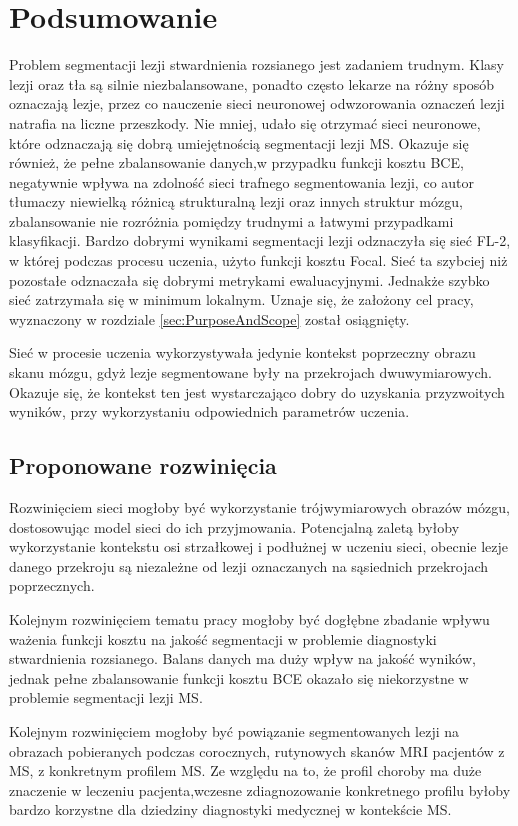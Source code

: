 \section{Podsumowanie}
\label{sec:Summary}
Problem segmentacji lezji stwardnienia rozsianego jest zadaniem trudnym. Klasy lezji oraz tła są silnie niezbalansowane, ponadto często lekarze na różny sposób oznaczają lezje, przez co nauczenie sieci neuronowej odwzorowania oznaczeń lezji natrafia na liczne przeszkody. Nie mniej, udało się otrzymać sieci neuronowe, które odznaczają się dobrą umiejętnością segmentacji lezji MS. Okazuje się również, że pełne zbalansowanie danych,w przypadku funkcji kosztu BCE, negatywnie wpływa na zdolność sieci trafnego segmentowania lezji, co autor tłumaczy niewielką różnicą strukturalną lezji oraz innych struktur mózgu, zbalansowanie nie rozróżnia pomiędzy trudnymi a łatwymi przypadkami klasyfikacji. Bardzo dobrymi wynikami segmentacji lezji odznaczyła się sieć FL-2, w której podczas procesu uczenia, użyto funkcji kosztu Focal. Sieć ta szybciej niż pozostałe odznaczała się dobrymi metrykami ewaluacyjnymi. Jednakże szybko sieć zatrzymała się w minimum lokalnym. Uznaje się, że założony cel pracy, wyznaczony w rozdziale \ref{sec:PurposeAndScope} został osiągnięty. 
\par
Sieć w procesie uczenia wykorzystywała jedynie kontekst poprzeczny obrazu skanu mózgu, gdyż lezje segmentowane były na przekrojach dwuwymiarowych. Okazuje się, że kontekst ten jest wystarczająco dobry do uzyskania przyzwoitych wyników, przy wykorzystaniu odpowiednich parametrów uczenia.

\subsection{Proponowane rozwinięcia}
\label{sec:extensions}
\par
Rozwinięciem sieci mogłoby być wykorzystanie trójwymiarowych obrazów mózgu, dostosowując model sieci do ich przyjmowania. Potencjalną zaletą byłoby wykorzystanie kontekstu osi strzałkowej i podłużnej w uczeniu sieci, obecnie lezje danego przekroju są niezależne od lezji oznaczanych na sąsiednich przekrojach poprzecznych.
\par
Kolejnym rozwinięciem tematu pracy mogłoby być dogłębne zbadanie wpływu ważenia funkcji kosztu na jakość segmentacji w problemie diagnostyki stwardnienia rozsianego. Balans danych ma duży wpływ na jakość wyników, jednak pełne zbalansowanie funkcji kosztu BCE okazało się niekorzystne w problemie segmentacji lezji MS.
\par
Kolejnym rozwinięciem mogłoby być powiązanie segmentowanych lezji na obrazach pobieranych podczas corocznych, rutynowych skanów MRI pacjentów z MS, z konkretnym profilem MS. Ze względu na to, że profil choroby ma duże znaczenie w leczeniu pacjenta,wczesne zdiagnozowanie konkretnego profilu byłoby bardzo korzystne dla dziedziny diagnostyki medycznej w kontekście MS.

